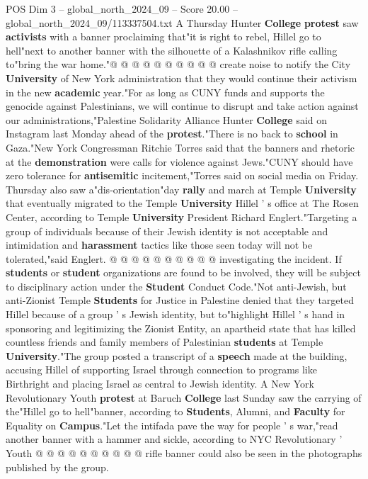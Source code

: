 \begin{textsample}{POS Dim 3 – global\_north\_2024\_09 – Score 20.00 – global\_north\_2024\_09/113337504.txt}
A Thursday Hunter \textbf{College} \textbf{protest} saw \textbf{activists} with a banner proclaiming that"it is right to rebel, Hillel go to hell"next to another banner with the silhouette of a Kalashnikov rifle calling to"bring the war home."@ @ @ @ @ @ @ @ @ @ create noise to notify the City \textbf{University} of New York administration that they would continue their activism in the new \textbf{academic} year."For as long as CUNY funds and supports the genocide against Palestinians, we will continue to disrupt and take action against our administrations,"Palestine Solidarity Alliance Hunter \textbf{College} said on Instagram last Monday ahead of the \textbf{protest}."There is no back to \textbf{school} in Gaza."New York Congressman Ritchie Torres said that the banners and rhetoric at the \textbf{demonstration} were calls for violence against Jews."CUNY should have zero tolerance for \textbf{antisemitic} incitement,"Torres said on social media on Friday.
Thursday also saw a"dis-orientation"day \textbf{rally} and march at Temple \textbf{University} that eventually migrated to the Temple \textbf{University} Hillel ' s office at The Rosen Center, according to Temple \textbf{University} President Richard Englert."Targeting a group of individuals because of their Jewish identity is not acceptable and intimidation and \textbf{harassment} tactics like those seen today will not be tolerated,"said Englert. @ @ @ @ @ @ @ @ @ @ investigating the incident.
If \textbf{students} or \textbf{student} organizations are found to be involved, they will be subject to disciplinary action under the \textbf{Student} Conduct Code."Not anti-Jewish, but anti-Zionist Temple \textbf{Students} for Justice in Palestine denied that they targeted Hillel because of a group ' s Jewish identity, but to"highlight Hillel ' s hand in sponsoring and legitimizing the Zionist Entity, an apartheid state that has killed countless friends and family members of Palestinian \textbf{students} at Temple \textbf{University}."The group posted a transcript of a \textbf{speech} made at the building, accusing Hillel of supporting Israel through connection to programs like Birthright and placing Israel as central to Jewish identity.
A New York Revolutionary Youth \textbf{protest} at Baruch \textbf{College} last Sunday saw the carrying of the"Hillel go to hell"banner, according to \textbf{Students}, Alumni, and \textbf{Faculty} for Equality on \textbf{Campus}."Let the intifada pave the way for people ' s war,"read another banner with a hammer and sickle, according to NYC Revolutionary ' Youth @ @ @ @ @ @ @ @ @ @ rifle banner could also be seen in the photographs published by the group.

\end{textsample}
